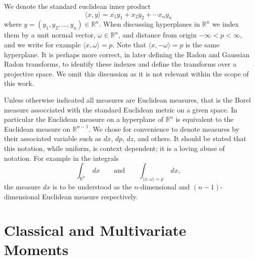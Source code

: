 \documentclass{amsart}
\theoremstyle{remark}
\numberwithin{equation}{section}
\newcommand{\RR}{\mathbb{R}}
\begin{document}
We denote the standard euclidean inner product
\[
    \langle x,y \rangle = x_1y_1 + x_2y_2 + \cdots x_ny_n
\]
where $y = (y_1, y_2, \ldots, y_n) \in \RR^n$. When discussing hyperplanes in $\RR^n$ we index them by a unit normal vector, $\omega \in \RR^n$, and distance from origin $-\infty < p < \infty$, and we write for example $\langle x, \omega \rangle = p$. Note that $\langle x, -\omega \rangle = p$ is the same hyperplane. It is perhaps more correct, in later defining the Radon and Gaussian Radon transforms, to identify these indexes and define the transforms over a projective space. We omit this discussion as it is not relevant within the scope of this work.
\begin{figure}
\end{figure}

Unless otherwise indicated all measures are Euclidean measures, that is the Borel measure assocciated with the standard Euclidean metric on a given space. In particular the Euclidean measure on a hyperplane of $\RR^n$ is equivalent to the Euclidean measure on $\RR^{n-1}$. We chose for convenience to denote measures by their associated variable such as $dx$, $dp$, $dz$, and others. It should be stated that this notation, while uniform, is context dependent; it is a loving abuse of notation. For example in the integrals
\[
    \int_{\RR^n}~dx \qquad \text{and} \qquad \int_{\langle x, \omega\rangle = p} ~dx,
\]
the measure $dx$ is to be understood as the $n$-dimensional and $(n-1)$-dimensional Euclidean measure respectively.

\newpage
\section{Classical and Multivariate Moments}
\end{document}
